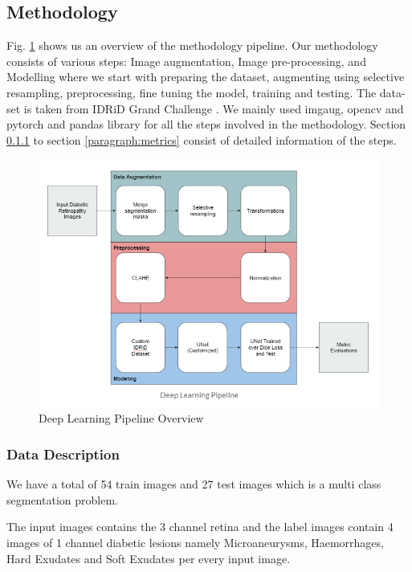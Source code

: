 \documentclass[conference]{IEEEtran}
\begin{document}
\subsection{Methodology}                                                                     
Fig. \ref{fig:dl} shows us an overview of the methodology pipeline. Our methodology consists of various steps: Image augmentation, Image pre-processing, and Modelling where we start with preparing the dataset, augmenting using selective resampling, preprocessing, fine tuning the model, training and testing. The data-set is taken from IDRiD Grand Challenge \cite{idrid}. We mainly  used imgaug, opencv and pytorch\cite{torch} and pandas library for all the steps involved in the methodology. Section \ref{sssec:describe} to section \ref{paragraph:metrics} consist of detailed information of the steps.    
\par              
\begin{figure}[t]
	\centering
	\includegraphics[scale=0.7]{image/dl_pipeline.PNG}
	\caption{Deep Learning Pipeline Overview}
	\label{fig:dl}
\end{figure}

\subsubsection{Data Description}
\label{sssec:describe}
We have a total of 54 train images and 27 test images which is a multi class segmentation problem. 
\par
The input images contains the 3 channel retina and the label images contain 4 images of 1 channel diabetic lesions namely Microaneurysms, Haemorrhages, Hard Exudates and Soft Exudates per every input image.
\end{document}
